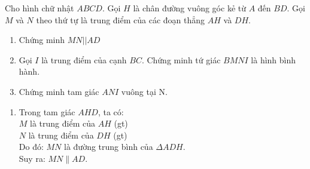 \begin{ex}%
	Cho hình chữ nhật $ABCD.$ Gọi $H$ là chân đường vuông góc kẻ từ $A$ đến $BD$. Gọi $M$ và $N$ theo thứ tự là trung điểm của các đoạn thẳng $AH$ và $DH.$
	\begin{enumerate}
	\item Chứng minh $MN||AD$
	\item Gọi $I$ là trung điểm của cạnh $BC$. Chứng minh tứ giác $BMNI$ là hình bình hành.
	\item Chứng minh tam giác $ANI$ vuông tại N.
	\end{enumerate}	
	\loigiai
	{
		\begin{enumerate}
		\item  Trong tam giác $AHD$, ta có:\\
		$M$ là trung điểm của $AH$ (gt)\\
		$N$ là trung điểm của $DH$ (gt)\\
		Do đó: $MN$ là đường trung bình của $\Delta ADH$.\\
		Suy ra: $MN\parallel AD$.	
	

\end{enumerate}}
\end{ex}
